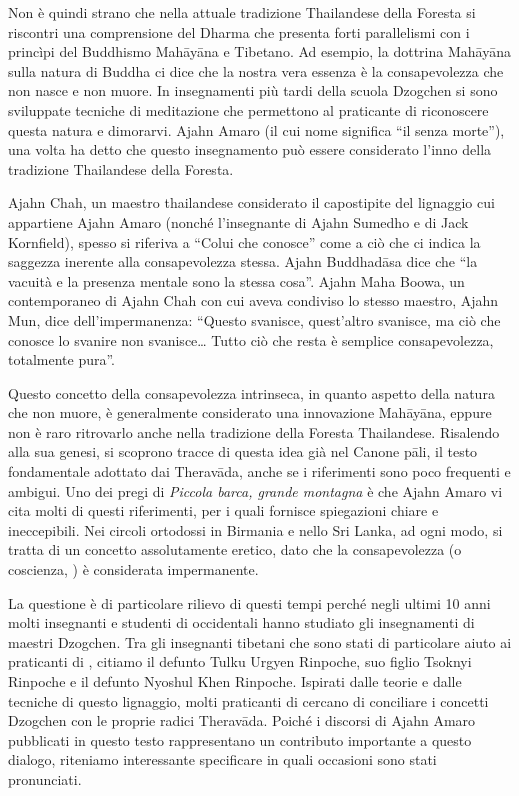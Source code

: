 Non è quindi strano che nella attuale tradizione Thailandese della Foresta si riscontri una comprensione del Dharma che presenta forti parallelismi con i princìpi del Buddhismo Mahāyāna e Tibetano. Ad esempio, la dottrina Mahāyāna sulla natura di Buddha ci dice che la nostra vera essenza è la consapevolezza che non nasce e non muore. In insegnamenti più tardi della scuola Dzogchen si sono sviluppate tecniche di meditazione che permettono al praticante di riconoscere questa natura e dimorarvi. Ajahn Amaro (il cui nome significa ``il senza morte''), una volta ha detto che questo insegnamento può essere considerato l'inno della tradizione Thailandese della Foresta.

Ajahn Chah, un maestro thailandese considerato il capostipite del lignaggio cui appartiene Ajahn Amaro (nonché l'insegnante di Ajahn Sumedho e di Jack Kornfield), spesso si riferiva a ``Colui che conosce'' come a ciò che ci indica la saggezza inerente alla consapevolezza stessa. Ajahn Buddhadāsa dice che ``la vacuità e la presenza mentale sono la stessa cosa''. Ajahn Maha Boowa, un contemporaneo di Ajahn Chah con cui aveva condiviso lo stesso maestro, Ajahn Mun, dice dell'impermanenza: ``Questo svanisce, quest'altro svanisce, ma ciò che conosce lo svanire non svanisce\ldots{} Tutto ciò che resta è semplice consapevolezza, totalmente pura''.

Questo concetto della consapevolezza intrinseca, in quanto aspetto della natura che non muore, è generalmente considerato una innovazione Mahāyāna, eppure non è raro ritrovarlo anche nella tradizione della Foresta Thailandese. Risalendo alla sua genesi, si scoprono tracce di questa idea già nel Canone pāli, il testo fondamentale adottato dai Theravāda, anche se i riferimenti sono poco frequenti e ambigui. Uno dei pregi di \textit{Piccola barca, grande montagna} è che Ajahn Amaro vi cita molti di questi riferimenti, per i quali fornisce spiegazioni chiare e ineccepibili. Nei circoli ortodossi in Birmania e nello Sri Lanka, ad ogni modo, si tratta di un concetto assolutamente eretico, dato che la consapevolezza (o coscienza, ) è considerata impermanente. 

La questione è di particolare rilievo di questi tempi perché negli ultimi 10 anni molti insegnanti e studenti di  occidentali hanno studiato gli insegnamenti di maestri Dzogchen. Tra gli insegnanti tibetani che sono stati di particolare aiuto ai praticanti di , citiamo il defunto Tulku Urgyen Rinpoche, suo figlio Tsoknyi Rinpoche e il defunto Nyoshul Khen Rinpoche. Ispirati dalle teorie e dalle tecniche di questo lignaggio, molti praticanti di  cercano di conciliare i concetti Dzogchen con le proprie radici Theravāda. Poiché i discorsi di Ajahn Amaro pubblicati in questo testo rappresentano un contributo importante a questo dialogo, riteniamo interessante specificare in quali occasioni sono stati pronunciati.

